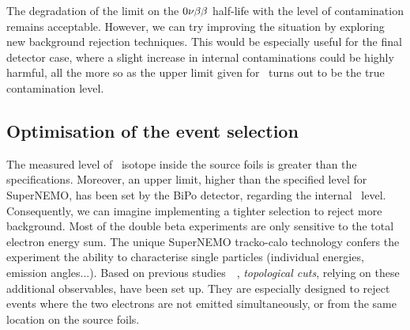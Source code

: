 The degradation of the limit on the $0\nu\beta\beta$ half-life with the level of contamination remains acceptable.
However, we can try improving the situation by exploring new background rejection techniques.
This would be especially useful for the final detector case, where a slight increase in internal contaminations could be highly harmful, all the more so as the upper limit given for \Bi\ turns out to be the true contamination level.

\subsection{Optimisation of the event selection}
\label{subsec:opti_ev_selection}

The measured level of \Tl\ isotope inside the source foils is greater than the specifications.
Moreover, an upper limit, higher than the specified level for SuperNEMO, has been set by the BiPo detector, regarding the internal \Bi\ level.
Consequently, we can imagine implementing a tighter selection to reject more background.
Most of the double beta experiments are only sensitive to the total electron energy sum.
The unique SuperNEMO tracko-calo technology confers the experiment the ability to characterise single particles (individual energies, emission angles...).
Based on previous studies~\cite{CalvezThesis}~\cite{ChaponThesis}, \emph{topological cuts}, relying on these additional observables, have been set up.
They are especially designed to reject events where the two electrons are not emitted simultaneously, or from the same location on the source foils.

